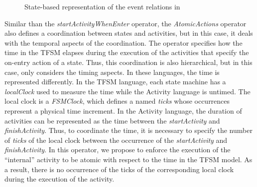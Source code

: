 \begin{figure}
	\centering
	\caption[]{State-based representation of the event relations in \moccml}
	\label{fig:subfigurestatebased}
\end{figure}



Similar than the \emph{startActivityWhenEnter} operator, the \emph{AtomicActions} operator also defines a coordination between states and activities, but in this case, it deals with the temporal aspects of the coordination. The operator specifies how the time in the TFSM elapses during the execution of the activities that specify the on-entry action of a state. Thus, this coordination is also hierarchical, but in this case, only considers the timing aspects. In these languages, the time is represented differently. In the TFSM language, each state machine has a \emph{localClock} used to measure the time while the Activity language is untimed. The local clock is a \emph{FSMClock}, which defines a \dse named \emph{ticks} whose occurrences represent a physical time increment. In the Activity language, the duration of activities can be represented as the time between the \dse \emph{startActivity} and \dse \emph{finishActivity}. Thus, to coordinate the time, it is necessary to specify the number of \emph{ticks} of the local clock between the occurrence of the \dse \emph{startActivity} and \emph{finishActivity}. In this operator, we propose to enforce the execution of the ``internal'' activity to be atomic with respect to the time in the TFSM model. As a result, there is no occurrence of the \dse ticks of the corresponding local clock during the execution of the activity. 

